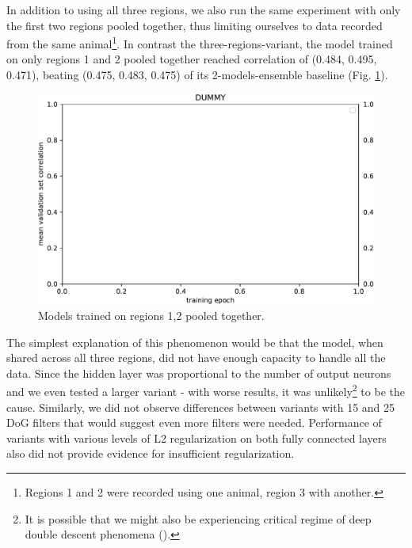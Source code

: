 In addition to using all three regions, we also run the same experiment with only the first two regions pooled together, thus limiting ourselves to data recorded from the same animal\footnote{Regions 1 and 2 were recorded using one animal, region 3 with another.}. In contrast the three-regions-variant, the model trained on only regions 1 and 2 pooled together reached correlation of (0.484, 0.495, 0.471), beating (0.475, 0.483, 0.475) of its 2-models-ensemble baseline (Fig. \ref{fig:5.3.1.1_2}).

\begin{figure}[H]
    \centering
    \includegraphics[width=1\textwidth]{../figures/05_dummy}
    \caption[Experiment 3.1.1 2]{Models trained on regions 1,2 pooled together\protect\footnotemark.}
    \label{fig:5.3.1.1_2}
\end{figure}

The simplest explanation of this phenomenon would be that the model, when shared across all three regions, did not have enough capacity to handle all the data. Since the hidden layer was proportional to the number of output neurons and we even tested a larger variant - with worse results, it was unlikely\footnote{It is possible that we might also be experiencing critical regime of deep double descent phenomena (\cite{2019arXiv191202292N}).} to be the cause. Similarly, we did not observe differences between variants with 15 and 25 DoG filters that would suggest even more filters were needed. Performance of variants with various levels of L2 regularization on both fully connected layers also did not provide evidence for insufficient regularization. 

